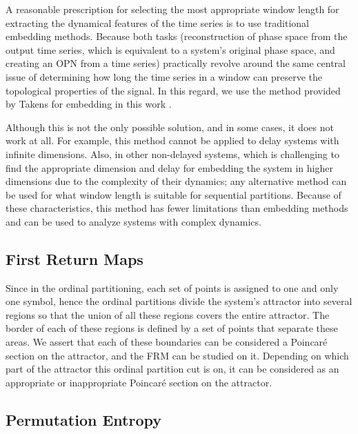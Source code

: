 \documentclass[%
 aip,
 amsmath,amssymb,
 reprint,%
]{revtex4-1}
\begin{document}
A reasonable prescription for selecting the most appropriate window length for extracting the dynamical features of the time series is to use traditional embedding methods. Because both tasks (reconstruction of phase space from the output time series, which is equivalent to a system's original phase space, and creating an OPN from a time series) practically revolve around the same central issue of determining how long the time series in a window can preserve the topological properties of the signal. In this regard, we use the method provided by Takens for embedding in this work \cite{r2}.

Although this is not the only possible solution, and in some cases, it does not work at all. For example, this method cannot be applied to delay systems with infinite dimensions. Also, in other non-delayed systems, which is challenging to find the appropriate dimension and delay for embedding the system in higher dimensions due to the complexity of their dynamics; any alternative method can be used for what window length is suitable for sequential partitions. Because of these characteristics, this method has fewer limitations than embedding methods and can be used to analyze systems with complex dynamics.

\subsection{\label{sec:First Return Maps}First Return Maps}

Since in the ordinal partitioning, each set of points is assigned to one and only one symbol, hence the ordinal partitions divide the system's attractor into several regions so that the union of all these regions covers the entire attractor. The border of each of these regions is defined by a set of points that separate these areas. We assert that each of these boundaries can be considered a Poincar\'e section on the attractor, and the FRM can be studied on it. Depending on which part of the attractor this ordinal partition cut is on, it can be considered as an appropriate or inappropriate Poincar\'e section on the attractor.

\subsection{\label{sec:Permutation Entropy}Permutation Entropy}
\end{document}
